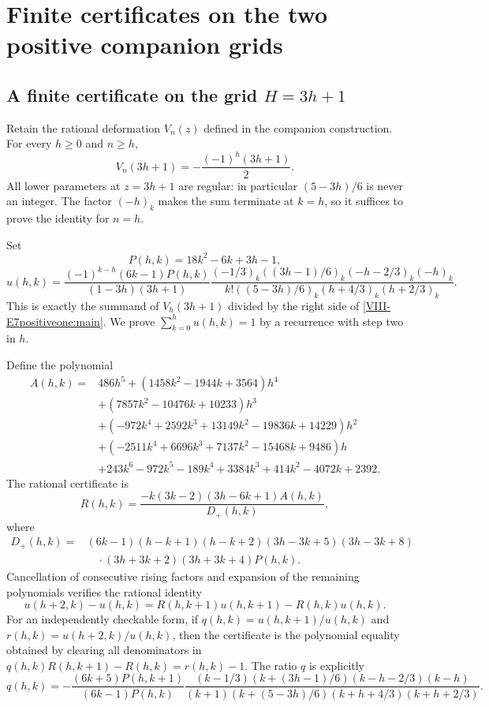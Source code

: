 \documentclass[11pt,letterpaper]{article}
\numberwithin{equation}{section}
\newcommand{\LocalAppendix}{\setcounter{section}{0}\setcounter{subsection}{0}\renewcommand{\thesection}{\Alph{section}}}
\begin{document}
\LocalAppendix
\section{Finite certificates on the two positive companion grids}\label{loc-VIII-A}

\subsection{A finite certificate on the grid $H=3h+1$}
Retain the rational deformation $V_n(z)$ defined in the companion
construction. For every $h\ge0$ and $n\ge h$,
\begin{equation}\label{VIII-E7positiveone:main}
 V_n(3h+1)=-\frac{(-1)^h(3h+1)}2.
\end{equation}
All lower parameters at $z=3h+1$ are regular: in particular
$(5-3h)/6$ is never an integer. The factor $(-h)_k$ makes the
sum terminate at $k=h$, so it suffices to prove the identity for $n=h$.

Set
\[
 P(h,k)=18k^2-6k+3h-1,
\]
\[
 u(h,k)=\frac{(-1)^{k-h}(6k-1)P(h,k)}{(1-3h)(3h+1)}
 \frac{(-1/3)_k((3h-1)/6)_k(-h-2/3)_k(-h)_k}
 {k!((5-3h)/6)_k(h+4/3)_k(h+2/3)_k}.
\]
This is exactly the summand of $V_h(3h+1)$ divided by the
right side of \eqref{VIII-E7positiveone:main}. We prove
$\sum_{k=0}^hu(h,k)=1$ by a recurrence with step two in $h$.

Define the polynomial
\begin{align*}
 A(h,k)={}&486h^5+(1458k^2-1944k+3564)h^4\\
 &+(7857k^2-10476k+10233)h^3\\
 &+(-972k^4+2592k^3+13149k^2-19836k+14229)h^2\\
 &+(-2511k^4+6696k^3+7137k^2-15468k+9486)h\\
 &+243k^6-972k^5-189k^4+3384k^3+414k^2-4072k+2392.
\end{align*}
The rational certificate is
\[
 R(h,k)=\frac{-k(3k-2)(3h-6k+1)A(h,k)}{D_+(h,k)},
\]
where
\begin{align*}
 D_+(h,k)={}&(6k-1)(h-k+1)(h-k+2)(3h-3k+5)(3h-3k+8)\\
 &\quad\cdot(3h+3k+2)(3h+3k+4)P(h,k).
\end{align*}
Cancellation of consecutive rising factors and expansion of the
remaining polynomials verifies the rational identity
\begin{equation}\label{VIII-E7positiveone:certificate}
 u(h+2,k)-u(h,k)
 =R(h,k+1)u(h,k+1)-R(h,k)u(h,k).
\end{equation}
For an independently checkable form, if
$q(h,k)=u(h,k+1)/u(h,k)$ and $r(h,k)=u(h+2,k)/u(h,k)$,
then the certificate is the polynomial equality obtained by clearing
all denominators in
$q(h,k)R(h,k+1)-R(h,k)=r(h,k)-1$.
The ratio $q$ is explicitly
\[
 q(h,k)=-\frac{(6k+5)P(h,k+1)}{(6k-1)P(h,k)}
 \frac{(k-1/3)(k+(3h-1)/6)(k-h-2/3)(k-h)}
 {(k+1)(k+(5-3h)/6)(k+h+4/3)(k+h+2/3)}.
\]
\end{document}
